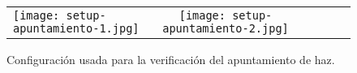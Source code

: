 \documentclass{article}
\newenvironment{standalone}{\begin{preview}}{\end{preview}}
\begin{document}
\begin{standalone}
  \begin{figure}[!htbp]
    \centering

    \begin{tabular}{lccccc}
      \texttt{[image: setup-apuntamiento-1.jpg]}&
      \texttt{[image: setup-apuntamiento-2.jpg]}\\
    \end{tabular}

    \caption{Configuración usada para la verificación del apuntamiento de haz.}
    \label{fig:setup-apuntamiento}
  \end{figure}

\end{standalone}
\end{document}
